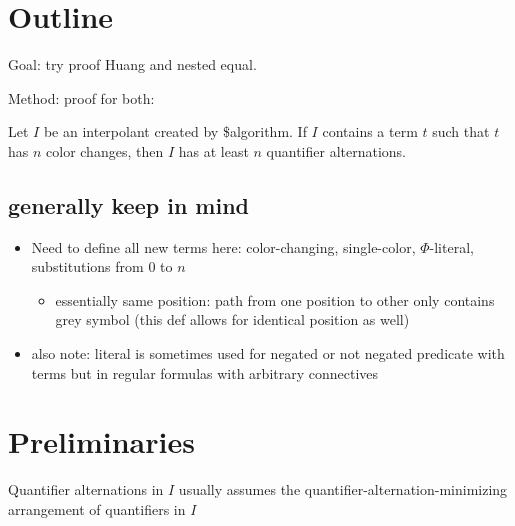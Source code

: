 \documentclass[,%
	draft=false,%
	numbers=noendperiod
	12pt,
	a4paper,
	oneside,%
	openany,
]{memoir}
\begin{document}

\section{ Outline }

Goal: try proof Huang and nested equal.

Method: proof for both:

\begin{cprop}
	Let $I$ be an interpolant created by \$algorithm.
	If $I$ contains a term $t$ such that $t$ has $n$ color changes, then $I$ has at least $n$ quantifier alternations.
\end{cprop}

\subsection{generally keep in mind}

\begin{itemize}
	\item Need to define all new terms here: color-changing, single-color, $\Phi$-literal, substitutions from $0$ to $n$
		\begin{itemize}
			\item essentially same position: path from one position to other only contains grey symbol (this def allows for identical position as well)
		\end{itemize}
	\item also note: literal is sometimes used for negated or not negated predicate with terms but in regular formulas with arbitrary connectives
\end{itemize}

\section{ Preliminaries }

Quantifier alternations in $I$ usually assumes the quantifier-alternation-minimizing arrangement of quantifiers in $I$ 
\end{document}
